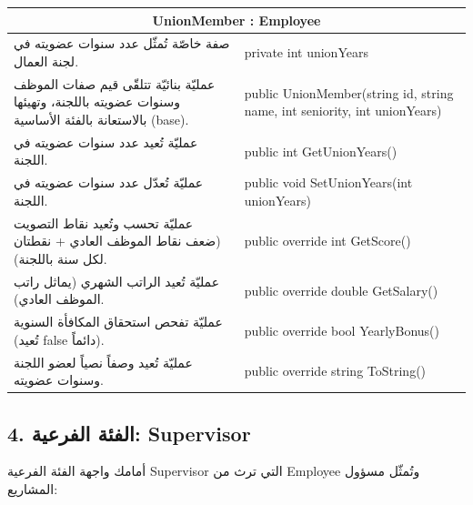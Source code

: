 \documentclass[14pt]{extarticle}
\begin{document}
\begin{center}
\renewcommand{\arraystretch}{1.5}
{\small
\begin{tabular}{|p{}|p{}|}
\hline
\multicolumn{2}{|c|}{\textbf{\textenglish{UnionMember : Employee}}} \\
\hline
صفة خاصّة تُمثّل عدد سنوات عضويته في لجنة العمال. & \textenglish{private int unionYears} \\
\hline
عمليّة بنائيّة تتلقّى قيم صفات الموظف وسنوات عضويته باللجنة، وتهيئها بالاستعانة بالفئة الأساسية (\textenglish{base}). & \textenglish{public UnionMember(string id, string name, int seniority, int unionYears)} \\
\hline
عمليّة تُعيد عدد سنوات عضويته في اللجنة. & \textenglish{public int GetUnionYears()} \\
\hline
عمليّة تُعدّل عدد سنوات عضويته في اللجنة. & \textenglish{public void SetUnionYears(int unionYears)} \\
\hline
عمليّة تحسب وتُعيد نقاط التصويت (ضعف نقاط الموظف العادي + نقطتان لكل سنة باللجنة). & \textenglish{public override int GetScore()} \\
\hline
عمليّة تُعيد الراتب الشهري (يماثل راتب الموظف العادي). & \textenglish{public override double GetSalary()} \\
\hline
عمليّة تفحص استحقاق المكافأة السنوية (تُعيد \textenglish{false} دائماً). & \textenglish{public override bool YearlyBonus()} \\
\hline
عمليّة تُعيد وصفاً نصياً لعضو اللجنة وسنوات عضويته. & \textenglish{public override string ToString()} \\
\hline
\end{tabular}
}
\end{center}

\clearpage

\subsection*{4. الفئة الفرعية: \textenglish{Supervisor}}
أمامك واجهة الفئة الفرعية \textenglish{Supervisor} التي ترث من \textenglish{Employee} وتُمثّل مسؤول المشاريع:
\end{document}
